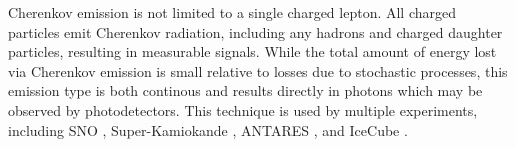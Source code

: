 Cherenkov emission is not limited to a single charged lepton. 
All charged particles emit Cherenkov radiation, including any hadrons and charged daughter particles, resulting in measurable signals.
While the total amount of energy lost via Cherenkov emission is small relative to losses due to stochastic processes, this emission type is both continous and results directly in photons which may be observed by photodetectors.
This technique is used by multiple experiments, including SNO \cite{Description-SNO}, Super-Kamiokande \cite{Description-SuperK}, ANTARES \cite{Description-ANTARES}, and IceCube \cite{Description-IceCube}.

